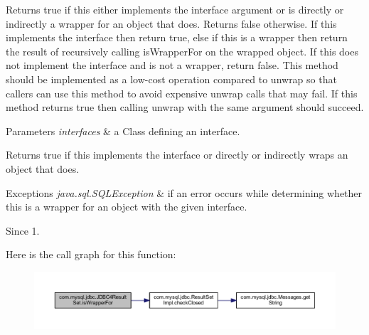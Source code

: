 Returns true if this either implements the interface argument or is directly or indirectly a wrapper for an object that does. Returns false otherwise. If this implements the interface then return true, else if this is a wrapper then return the result of recursively calling {\ttfamily is\+Wrapper\+For} on the wrapped object. If this does not implement the interface and is not a wrapper, return false. This method should be implemented as a low-\/cost operation compared to {\ttfamily unwrap} so that callers can use this method to avoid expensive {\ttfamily unwrap} calls that may fail. If this method returns true then calling {\ttfamily unwrap} with the same argument should succeed.


\begin{DoxyParams}{Parameters}
{\em interfaces} & a Class defining an interface. \\
\hline
\end{DoxyParams}
\begin{DoxyReturn}{Returns}
true if this implements the interface or directly or indirectly wraps an object that does. 
\end{DoxyReturn}

\begin{DoxyExceptions}{Exceptions}
{\em java.\+sql.\+S\+Q\+L\+Exception} & if an error occurs while determining whether this is a wrapper for an object with the given interface. \\
\hline
\end{DoxyExceptions}
\begin{DoxySince}{Since}
1. 
\end{DoxySince}
Here is the call graph for this function\+:
\nopagebreak
\begin{figure}[H]
\begin{center}
\leavevmode
\includegraphics[width=350pt]{classcom_1_1mysql_1_1jdbc_1_1_j_d_b_c4_result_set_a57d383b2ccf7020664d948a4fc2c09ea_cgraph}
\end{center}
\end{figure}
\mbox{\label{classcom_1_1mysql_1_1jdbc_1_1_j_d_b_c4_result_set_a5d72c53312683748786c1416e5e14bf5}} 
